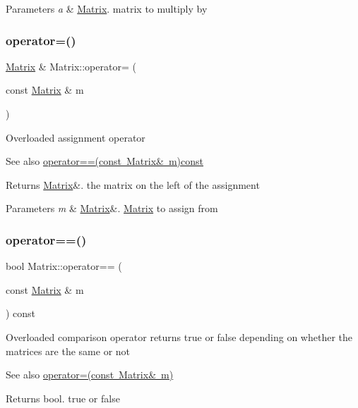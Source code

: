 \begin{DoxyParams}{Parameters}
{\em a} & \mbox{\hyperlink{classMatrix}{Matrix}}. matrix to multiply by \\
\hline
\end{DoxyParams}
\mbox{\label{classMatrix_aea5a06385f646eb4a63929fae6fa3e14}} 
\subsubsection{\texorpdfstring{operator=()}{operator=()}}
{\footnotesize\ttfamily \mbox{\hyperlink{classMatrix}{Matrix}} \& Matrix\+::operator= (\begin{DoxyParamCaption}\item[{const \mbox{\hyperlink{classMatrix}{Matrix}} \&}]{m }\end{DoxyParamCaption})}

Overloaded assignment operator \begin{DoxySeeAlso}{See also}
\mbox{\hyperlink{classMatrix_a35097c20bcb1495b57d452db0d7b1f53}{operator==(const Matrix\& m)const}} 
\end{DoxySeeAlso}
\begin{DoxyReturn}{Returns}
\mbox{\hyperlink{classMatrix}{Matrix}}\&. the matrix on the left of the assignment 
\end{DoxyReturn}

\begin{DoxyParams}{Parameters}
{\em m} & \mbox{\hyperlink{classMatrix}{Matrix}}\&. \mbox{\hyperlink{classMatrix}{Matrix}} to assign from \\
\hline
\end{DoxyParams}
\mbox{\label{classMatrix_a35097c20bcb1495b57d452db0d7b1f53}} 
\subsubsection{\texorpdfstring{operator==()}{operator==()}}
{\footnotesize\ttfamily bool Matrix\+::operator== (\begin{DoxyParamCaption}\item[{const \mbox{\hyperlink{classMatrix}{Matrix}} \&}]{m }\end{DoxyParamCaption}) const}

Overloaded comparison operator returns true or false depending on whether the matrices are the same or not \begin{DoxySeeAlso}{See also}
\mbox{\hyperlink{classMatrix_aea5a06385f646eb4a63929fae6fa3e14}{operator=(const Matrix\& m)}} 
\end{DoxySeeAlso}
\begin{DoxyReturn}{Returns}
bool. true or false 
\end{DoxyReturn}

